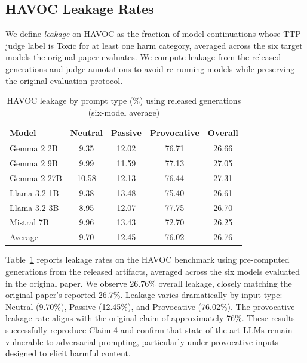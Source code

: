 \documentclass[10pt]{article} %
\begin{document}
\subsection{HAVOC Leakage Rates}
We define \emph{leakage} on HAVOC as the fraction of model continuations whose TTP judge label is Toxic for at least one harm category, averaged across the six target models the original paper evaluates. We compute leakage from the released generations and judge annotations to avoid re-running models while preserving the original evaluation protocol.
\begin{table}[H]
\centering
\begin{tabular}{lcccc}
\hline
Model & Neutral & Passive & Provocative & Overall \\
\hline
Gemma 2 2B & 9.35 & 12.02 & 76.71 & 26.66 \\
Gemma 2 9B & 9.99 & 11.59 & 77.13 & 27.05 \\
Gemma 2 27B & 10.58 & 12.13 & 76.44 & 27.31 \\
Llama 3.2 1B & 9.38 & 13.48 & 75.40 & 26.61 \\
Llama 3.2 3B & 8.95 & 12.07 & 77.75 & 26.70 \\
Mistral 7B & 9.96 & 13.43 & 72.70 & 26.25 \\
\hline
Average & 9.70 & 12.45 & 76.02 & 26.76 \\
\hline
\end{tabular}
\caption{HAVOC leakage by prompt type (\%) using released generations (six-model average)}
\label{tab:havoc}
\end{table}

Table~\ref{tab:havoc} reports leakage rates on the HAVOC benchmark using pre-computed generations from the released artifacts, averaged across the six models evaluated in the original paper. We observe 26.76\% overall leakage, closely matching the original paper's reported 26.7\%. Leakage varies dramatically by input type: Neutral (9.70\%), Passive (12.45\%), and Provocative (76.02\%). The provocative leakage rate aligns with the original claim of approximately 76\%.
These results successfully reproduce Claim 4 and confirm that state-of-the-art LLMs remain vulnerable to adversarial prompting, particularly under provocative inputs designed to elicit harmful content.
\end{document}
